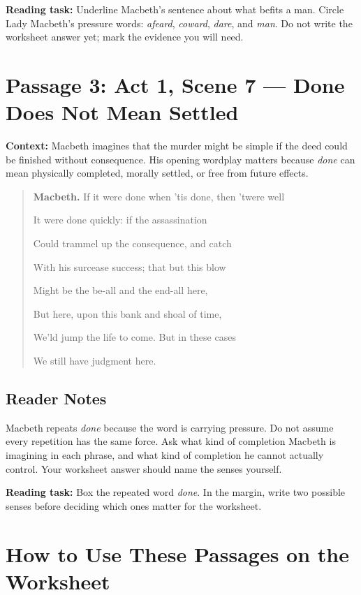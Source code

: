 \documentclass[12pt]{article}
\newenvironment{playpassage}{\begin{quote}\small\setlength{\parskip}{0.25em}}{\end{quote}}
\newcommand{\speaker}[1]{\textbf{#1.}}
\begin{document}
\textbf{Reading task:} Underline Macbeth's sentence about what befits a man. Circle Lady Macbeth's pressure words: \textit{afeard}, \textit{coward}, \textit{dare}, and \textit{man}. Do not write the worksheet answer yet; mark the evidence you will need.

\section*{Passage 3: Act 1, Scene 7 --- Done Does Not Mean Settled}

\textbf{Context:} Macbeth imagines that the murder might be simple if the deed could be finished without consequence. His opening wordplay matters because \textit{done} can mean physically completed, morally settled, or free from future effects.

\begin{playpassage}
\speaker{Macbeth} If it were done when 'tis done, then 'twere well\par
It were done quickly: if the assassination\par
Could trammel up the consequence, and catch\par
With his surcease success; that but this blow\par
Might be the be-all and the end-all here,\par
But here, upon this bank and shoal of time,\par
We'ld jump the life to come. But in these cases\par
We still have judgment here.
\end{playpassage}

\subsection*{Reader Notes}

Macbeth repeats \textit{done} because the word is carrying pressure. Do not assume every repetition has the same force. Ask what kind of completion Macbeth is imagining in each phrase, and what kind of completion he cannot actually control. Your worksheet answer should name the senses yourself.

\textbf{Reading task:} Box the repeated word \textit{done}. In the margin, write two possible senses before deciding which ones matter for the worksheet.

\section*{How to Use These Passages on the Worksheet}
\end{document}

